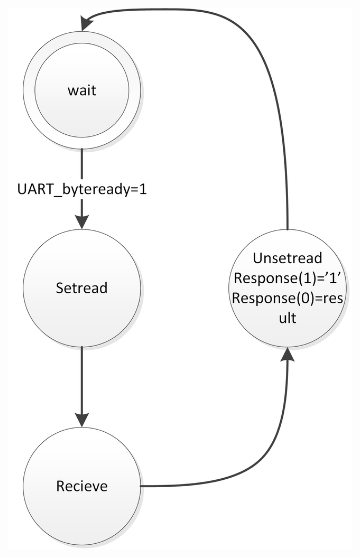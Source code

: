 \documentclass{report}
\begin{document}
\begin{figure}
\centering
\caption{De FSM's op de FPGA}
\begin{subfigure}{0.23\linewidth}
\label{fig:fsmReceiver}
\includegraphics[width=\linewidth]{FSMReceiver}
\end{subfigure}
\quad
\begin{subfigure}{0.46\linewidth}
\label{fig:fsmMain}

\end{subfigure}
\end{figure}
\end{document}
